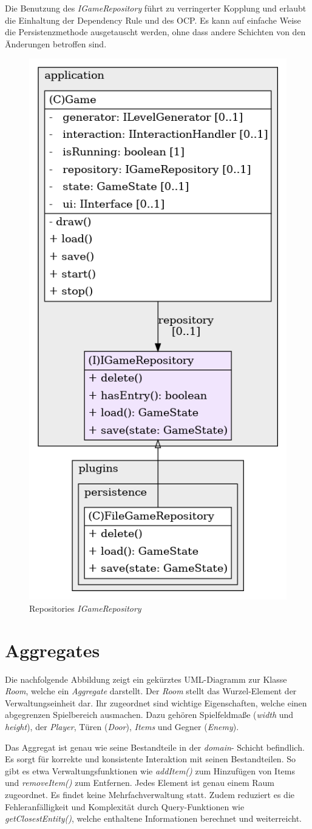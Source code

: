 Die Benutzung des \textit{IGameRepository} führt zu verringerter
Kopplung und erlaubt die Einhaltung der Dependency Rule und des OCP.
Es kann auf einfache Weise die Persistenzmethode ausgetauscht werden,
ohne dass andere Schichten von den Änderungen betroffen sind.

\vspace{0.5cm}
\begin{figure}[H]
    \centering
    \includegraphics[width=0.3\linewidth]{Bilder/Visualisierung/IGameRepository_structure.png}
    \caption{Repositories \textit{IGameRepository}}
\end{figure}

\section{Aggregates}
Die nachfolgende Abbildung zeigt ein gekürztes UML-Diagramm zur Klasse
\textit{Room}, welche ein \textit{Aggregate} darstellt. Der \textit{Room}
stellt das Wurzel-Element der Verwaltungseinheit dar. Ihr zugeordnet
sind wichtige Eigenschaften, welche einen abgegrenzen Spielbereich
ausmachen. Dazu gehören Spielfeldmaße (\textit{width} und \textit{height}),
der \textit{Player}, Türen (\textit{Door}), \textit{Items} und Gegner
(\textit{Enemy}).

Das Aggregat ist genau wie seine Bestandteile in der \textit{domain}-
Schicht befindlich. Es sorgt für korrekte und konsistente Interaktion
mit seinen Bestandteilen. So gibt es etwa Verwaltungsfunktionen wie
\textit{addItem()} zum Hinzufügen von Items und \textit{removeItem()}
zum Entfernen. Jedes Element ist genau einem Raum zugeordnet. Es findet
keine Mehrfachverwaltung statt. Zudem reduziert es die Fehleranfälligkeit
und Komplexität durch Query-Funktionen wie \textit{getClosestEntity()},
welche enthaltene Informationen berechnet und weiterreicht. 

